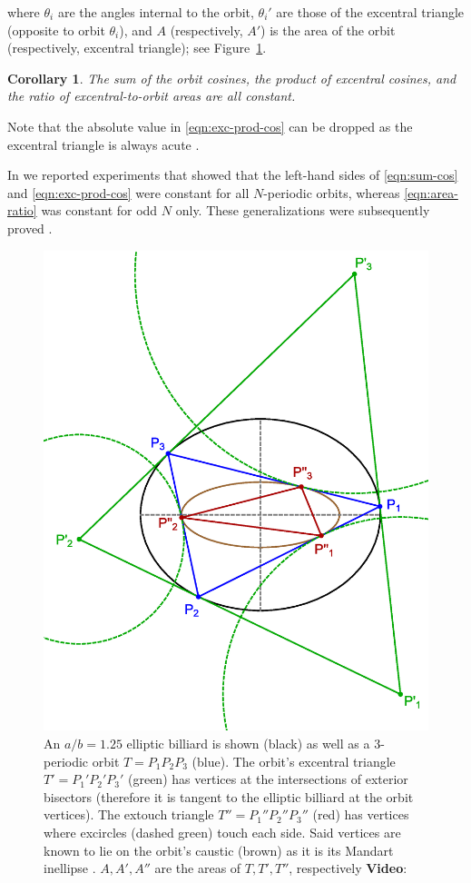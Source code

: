 \documentclass{article}
\newtheorem{corollary}{Corollary}
\theoremstyle{definition}
\begin{document}
\noindent where $\theta_i$ are the angles internal to the orbit, $\theta_i'$ are those of the excentral triangle (opposite to orbit $\theta_i$), and $A$ (respectively, $A'$) is the area of the orbit (respectively, excentral triangle); see Figure~\ref{fig:orbit-outer-inner}.

\begin{corollary}
The sum of the orbit cosines, the product of excentral cosines, and the ratio of excentral-to-orbit areas are all constant.
\end{corollary}

Note that the absolute value in \eqref{eqn:exc-prod-cos} can be dropped as the excentral triangle is always acute \cite{coxeter67}.

In \cite{reznik2019-intelligencer} we reported experiments that showed that the left-hand sides of \eqref{eqn:sum-cos} and \eqref{eqn:exc-prod-cos} were constant for all $N$-periodic orbits, whereas \eqref{eqn:area-ratio} was constant for odd $N$ only. These generalizations were subsequently proved \cite{akopyan2020-invariants,bialy2020-invariants}.

\begin{figure}[H]
    \centering
    \includegraphics[width=.6\textwidth]{1090_orbit_outer_inner}
    \caption{An $a/b=1.25$ elliptic billiard is shown (black) as well as a 3-periodic orbit $T=P_1P_2P_3$ (blue). The orbit's excentral triangle $T'=P_1'P_2'P_3'$ (green) has vertices at the intersections of exterior bisectors (therefore it is tangent to the elliptic billiard at the orbit vertices). The extouch triangle $T''=P_1''P_2''P_3''$ (red) has vertices   where excircles (dashed green) touch each side. Said vertices are known to lie on the orbit's caustic (brown) as it is its Mandart inellipse \cite[Mandart Inellipse]{mw}.  $A,A',A''$ are the areas of $T,T',T''$, respectively \textbf{Video}: \cite[PL\#06]{reznik2020-playlist-proofs}}
    \label{fig:orbit-outer-inner}
\end{figure}
\end{document}
